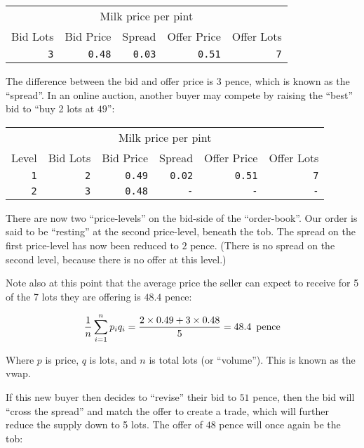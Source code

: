 \documentclass[11pt,a4paper]{article}
\begin{document}
\vspace{5mm}
\begin{tabular}{rrrrr}
\multicolumn{5}{c}{Milk price per pint}\\
Bid Lots&Bid Price&Spread&Offer Price&Offer Lots\\
\hline
\texttt{3}&\texttt{0.48}&\texttt{0.03}&\texttt{0.51}&\texttt{7}\\
\end{tabular}
\vspace{5mm}

The difference between the \gls{bid} and \gls{offer} price is $3$ pence, which is known as the
``\gls{spread}''. In an online \gls{auction}, another buyer may compete by raising the ``best''
\gls{bid} to ``buy 2 \glspl{lot} at $49$'':

\vspace{5mm}
\begin{tabular}{r|rrrrr}
\multicolumn{6}{c}{Milk price per pint}\\
Level&Bid Lots&Bid Price&Spread&Offer Price&Offer Lots\\
\hline
\texttt{1}&\texttt{2}&\texttt{0.49}&\texttt{0.02}&\texttt{0.51}&\texttt{7}\\
\texttt{2}&\texttt{3}&\texttt{0.48}&\texttt{-}&\texttt{-}&\texttt{-}\\
\end{tabular}
\vspace{5mm}

There are now two ``\glspl{price-level}'' on the \gls{bid}-side of the ``\gls{order-book}''. Our
order is said to be ``resting'' at the second \gls{price-level}, beneath the \gls{tob}. The
\gls{spread} on the first \gls{price-level} has now been reduced to $2$ pence. (There is no
\gls{spread} on the second level, because there is no \gls{offer} at this level.)

Note also at this point that the average price the seller can expect to receive for 5 of the 7
\glspl{lot} they are offering is $48.4$ pence:

\[
\frac{1}{n}\sum_{i=1}^{n}p_iq_i = \frac{2\times0.49+3\times0.48}{5} = 48.4 \enskip\mbox{pence}
\]

Where $p$ is price, $q$ is \glspl{lot}, and $n$ is total \glspl{lot} (or ``volume''). This is known
as the \gls{vwap}.

If this new buyer then decides to ``revise'' their \gls{bid} to $51$ pence, then the \gls{bid} will
``cross the \gls{spread}'' and match the \gls{offer} to create a trade, which will further reduce
the supply down to 5 \glspl{lot}. The \gls{offer} of $48$ pence will once again be the \gls{tob}:
\end{document}
